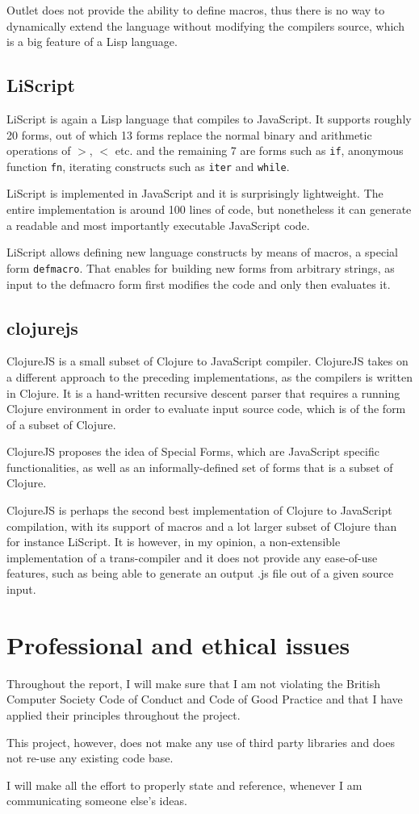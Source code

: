 Outlet does not provide the ability to define macros, thus there is no way to dynamically extend the language without modifying the compilers source, which is a big feature of a Lisp language.

\subsection{LiScript}
LiScript\cite{LiScript:2013:Site} is again a Lisp language that compiles to JavaScript. It supports roughly 20 forms, out of which 13 forms replace the normal binary and arithmetic operations of \texttt{$>$}, \texttt{$<$} etc. and the remaining 7 are forms such as \texttt{if}, anonymous function \texttt{fn}, iterating constructs such as \texttt{iter} and \texttt{while}.

LiScript is implemented in JavaScript and it is surprisingly lightweight. The entire implementation is around 100 lines of code, but nonetheless it can generate a readable and most importantly executable JavaScript code. 

LiScript allows defining new language constructs by means of macros, a special form \texttt{defmacro}. That enables for building new forms from arbitrary strings, as input to the defmacro form first modifies the code and only then evaluates it. 

\subsection{clojurejs}
ClojureJS\cite{ClojureJS:2011:Site} is a small subset of Clojure to JavaScript compiler.
ClojureJS takes on a different approach to the preceding implementations, as the compilers is written in Clojure. 
It is a hand-written recursive descent parser that requires a running Clojure environment in order to evaluate input source code, which is of the form of a subset of Clojure.

ClojureJS proposes the idea of Special Forms, which are JavaScript specific functionalities, as well as an informally-defined set of forms that is a subset of Clojure.

ClojureJS is perhaps the second best implementation of Clojure to JavaScript compilation, with its support of macros and a lot larger subset of Clojure than for instance LiScript. 
It is however, in my opinion, a non-extensible implementation of a trans-compiler and it does not provide any ease-of-use features, such as being able to generate an output .js file out of a given source input. 

\section{Professional and ethical issues}
Throughout the report, I will make sure that I am not violating the British Computer Society Code of Conduct and Code of Good Practice and that I have applied their principles throughout the project.

This project, however, does not make any use of third party libraries and does not re-use any existing code base.

I will make all the effort to properly state and reference, whenever I am communicating someone else's ideas.
